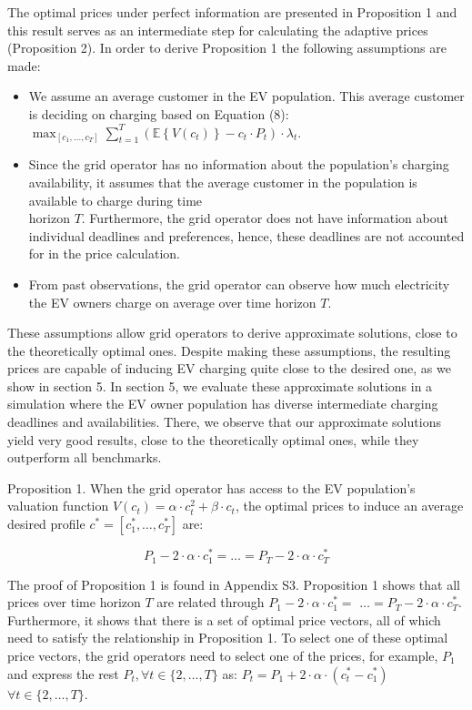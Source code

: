 \documentclass[10pt]{article}
\begin{document}
The optimal prices under perfect information are presented in Proposition 1 and this result serves as an intermediate step for calculating the adaptive prices (Proposition 2). In order to derive Proposition 1 the following assumptions are made:

\begin{itemize}
  \item We assume an average customer in the EV population. This average customer is deciding on charging based on Equation (8): $\max _{\left[c_{1}, \ldots, c_{T}\right]} \sum_{t=1}^{T}\left(\mathbb{E}\left\{V\left(c_{t}\right)\right\}-c_{t} \cdot P_{t}\right) \cdot \lambda_{t}$.
  \item Since the grid operator has no information about the population's charging availability, it assumes that the average customer in the population is available to charge during time\\
horizon $T$. Furthermore, the grid operator does not have information about individual deadlines and preferences, hence, these deadlines are not accounted for in the price calculation.
  \item From past observations, the grid operator can observe how much electricity the EV owners charge on average over time horizon $T$.
\end{itemize}

These assumptions allow grid operators to derive approximate solutions, close to the theoretically optimal ones. Despite making these assumptions, the resulting prices are capable of inducing EV charging quite close to the desired one, as we show in section 5. In section 5, we evaluate these approximate solutions in a simulation where the EV owner population has diverse intermediate charging deadlines and availabilities. There, we observe that our approximate solutions yield very good results, close to the theoretically optimal ones, while they outperform all benchmarks.

Proposition 1. When the grid operator has access to the EV population's valuation function $V\left(c_{t}\right)=\alpha \cdot c_{t}^{2}+\beta \cdot c_{t}$, the optimal prices to induce an average desired profile $c^{*}=\left[c_{1}^{*}, \ldots, c_{T}^{*}\right]$ are:


\begin{equation*}
P_{1}-2 \cdot \alpha \cdot c_{1}^{*}=\ldots=P_{T}-2 \cdot \alpha \cdot c_{T}^{*} \tag{13}
\end{equation*}


The proof of Proposition 1 is found in Appendix S3. Proposition 1 shows that all prices over time horizon $T$ are related through $P_{1}-2 \cdot \alpha \cdot c_{1}^{*}=$ $\ldots=P_{T}-2 \cdot \alpha \cdot c_{T}^{*}$. Furthermore, it shows that there is a set of optimal price vectors, all of which need to satisfy the relationship in Proposition 1. To select one of these optimal price vectors, the grid operators need to select one of the prices, for example, $P_{1}$ and express the rest $P_{t}, \forall t \in\{2, \ldots, T\}$ as: $P_{t}=P_{1}+2 \cdot \alpha \cdot\left(c_{t}^{*}-c_{1}^{*}\right)$ $\forall t \in\{2, \ldots, T\}$.
\end{document}
